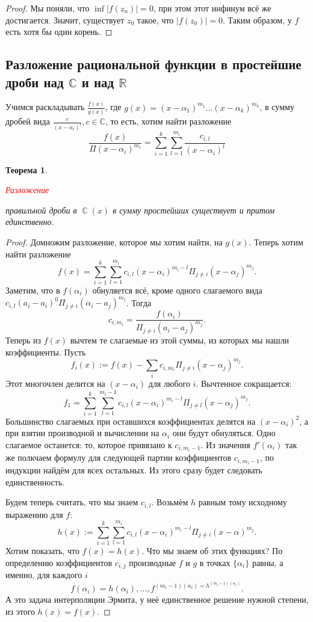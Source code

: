\documentclass[a4paper,100pt]{article}
\theoremstyle{indented}
\newtheorem{theorem}{Теорема}
\theoremstyle{definition}
\theoremstyle{remark}
\DeclareMathOperator{\CC}{\mathbb{C}}
\begin{document}
\begin{proof}
    Мы поняли, что $\inf \vert f(z_n)\vert=0$, при этом этот инфинум всё же достигается. Значит, существует $z_0$ такое, что $\vert f(z_0)\vert =0$. Таким образом, у $f$ есть хотя бы один корень.  
\end{proof}

\resetall

\subsection{Разложение рациональной функции в простейшие дроби над $\mathbb{C}$ и над $\mathbb{R}$}

Учимся раскладывать $\frac{f(x)}{g(x)}$, где $g(x)=(x-\alpha_1)^{m_1}\dots(x-\alpha_k)^{m_k}$,   в сумму дробей вида $\frac{c}{(x-\alpha_i)^{l}}, c\in\mathbb{C}$, то есть, хотим найти разложение
\[
    \frac{f(x)}{\Pi(x-\alpha_i)^{m_i}}=\sum_{i=1}^k\sum_{l=1}^{m_i} \frac{c_{i, l}}{(x-\alpha_i)^{l}}
\]

\begin{theorem}
    \hypertarget{n41}{\textcolor{red}{\textit{Разложение}}} правильной дроби в $\CC(x)$ в сумму простейших существует и притом единственно.
\end{theorem}

\begin{proof}
    Домножим разложение, которое мы хотим найти, на $g(x)$. Теперь хотим найти разложение
    \[
        f(x)=\sum_{i=1}^k\sum_{l=1}^{m_i}c_{i, l}(x-\alpha_i)^{m_i-l}\Pi_{j\neq i}(x-\alpha_j)^{m_j}.
    \]
    Заметим, что в $f(\alpha_i)$ обнуляется всё, кроме одного слагаемого вида $c_{i, l}(a_i-a_i)^0\Pi_{j\neq i}(\alpha_i-a_j)^{m_j}$. Тогда 
    \[
        c_{i, m_i}=\frac{f(\alpha_i)}{\Pi_{j\neq i}(a_i-a_j)^{m_j}}.
    \]
    Теперь из $f(x)$ вычтем те слагаемые из этой суммы, из которых мы нашли коэффициенты. Пусть 
    \[
        f_i(x):=f(x)-\sum_i c_{i, m_i}\Pi_{j\neq i}(x-\alpha_j)^{m_j}.
    \]
    Этот многочлен делится на $(x-\alpha_i)$ для любого $i$. Вычтенное сокращается:
    \[
        f_1=\sum_{i=1}^k\sum_{l=1}^{m_i-1}c_{i, l}(x-\alpha_i)^{m_i-l}\Pi_{j\neq l}(x-\alpha_j)^{m_j}.
    \]
    Большинство слагаемых при оставшихся коэффициентах делятся на $(x-\alpha_i)^2$, а при взятии производной и вычислении на $\alpha_i$ они будут обнуляться. Одно слагаемое останется: то, которое привязано к $c_{i, m_i-1}$. Из значения $f'(\alpha_i)$ так же полкчаем формулу для следующей партии коэффициентов $c_{i, m_i-1}$, по индукции найдём для всех остальных. Из этого сразу будет следовать единственность.\ 

    Будем теперь считать, что мы знаем $c_{i, l}$. Возьмём $h$ равным тому исходному выражению для $f$:
    \[
        h(x):=\sum_{i=1}^k\sum_{l=1}^{m_i}c_{i, l}(x-\alpha_i)^{m_i-l}\Pi_{j\neq i}(x-\alpha)^{m_j}.
    \]
    Хотим показать, что $f(x)=h(x)$. Что мы знаем об этих функциях? По определению коэффициентов $c_{i,j}$ производные $f$ и $g$ в точках $\{\alpha_i\}$ равны, а именно, для каждого $i$
    \[
        f(\alpha_i)=h(\alpha_i), \dots, f^{(m_i-1)(\alpha_i)=h^{(m_i-1)(\alpha_i)}}.
    \]
    А это задача интерполяции Эрмита, у неё единственное решение нужной степени, из этого $h(x)=f(x)$.
\end{proof}
\end{document}
